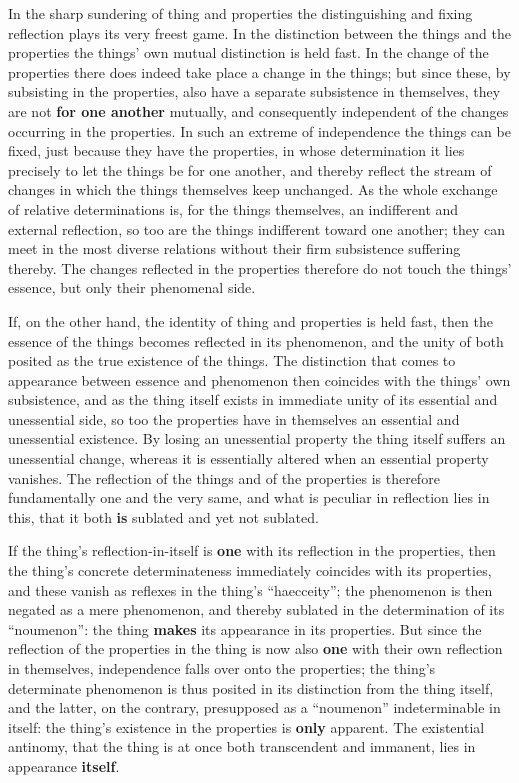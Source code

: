 \documentclass[12pt,a4paper,openany]{book}
\newcommand{\opage}[1]{\marginnote{\footnotesize\textit{[#1]}}}
\begin{document}
In the sharp sundering of thing and properties
the distinguishing and fixing reflection plays its very freest
game. In the distinction between the things and the properties
the things' own mutual distinction is held fast.
In the change of the properties there does indeed take place a
\setcounter{footnote}{0}%
\opage{174}change in the things; but since these, by subsisting in
the properties, also have a separate subsistence in themselves,
they are not \textbf{for one another} mutually, and consequently
independent of the changes occurring in the properties.
In such an extreme of independence the things
can be fixed, just because they have the properties, in whose
determination it lies precisely to let the things be
for one another, and thereby reflect the stream of changes
in which the things themselves keep unchanged.
As the whole exchange of relative determinations is, for the things
themselves, an indifferent and external reflection, so
too are the things indifferent toward one another;
they can meet in the most diverse relations without
their firm subsistence suffering thereby. The changes reflected
in the properties therefore do not touch the things'
essence, but only their phenomenal side.

If, on the other hand, the identity of thing and properties is held fast,
then the essence of the things becomes reflected in its phenomenon,
and the unity of both posited as the true existence of the things.
The distinction that comes to appearance between essence
and phenomenon then coincides with the things'
own subsistence, and as the thing itself exists in immediate
unity of its essential and unessential side,
so too the properties have in themselves an essential and
unessential existence. By losing an unessential property
the thing itself suffers an unessential change, whereas
it is essentially altered when an essential property
vanishes. The reflection of the things and of the properties
is therefore fundamentally one and the very same, and what is
peculiar in reflection lies in this, that it both
\textbf{is} sublated and yet not sublated.

If the thing's reflection-in-itself is \textbf{one} with its reflection
in the properties, then the thing's concrete determinateness
immediately coincides with its properties, and these
\setcounter{footnote}{0}%
\opage{175}vanish as reflexes in the thing's ``haecceity''; the phenomenon is then negated as a mere phenomenon, and thereby
sublated in the determination of its ``noumenon'': the thing
\textbf{makes} its appearance in its properties. But since the reflection of the properties
in the thing is now also \textbf{one} with
their own reflection in themselves, independence falls over
onto the properties; the thing's determinate phenomenon is
thus posited in its distinction from the thing itself, and the latter,
on the contrary, presupposed as a ``noumenon'' indeterminable in itself:
the thing's existence in the properties is \textbf{only} apparent.
The existential antinomy, that the thing is at once
both transcendent and immanent, lies in
appearance \textbf{itself}.
\end{document}
